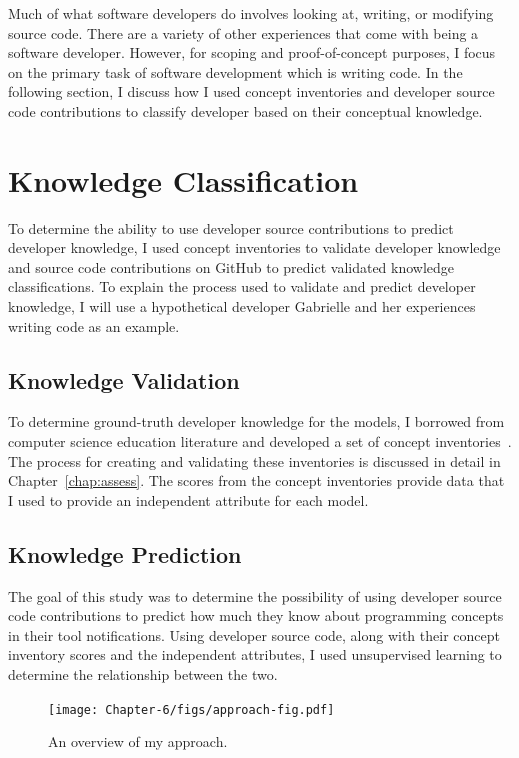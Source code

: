 Much of what software developers do involves looking at, writing, or modifying source code. 
There are a variety of other experiences that come with being a software developer. However, for scoping and proof-of-concept purposes, I focus on the primary task of software development which is writing code.
In the following section, I discuss how I used concept inventories and developer source code contributions to classify developer based on their conceptual knowledge.

\section{Knowledge Classification}

To determine the ability to use developer source contributions to predict developer knowledge, I used concept inventories to validate developer knowledge and source code contributions on GitHub to predict validated knowledge classifications.
To explain the process used to validate and predict developer knowledge, I will use a hypothetical developer Gabrielle and her experiences writing code as an example.

\subsection{Knowledge Validation}

To determine ground-truth developer knowledge for the models, I borrowed from computer science education literature and developed a set of concept inventories~\cite{tew2010assessing}.
The process for creating and validating these inventories is discussed in detail in Chapter~\ref{chap:assess}.
The scores from the concept inventories provide data that I used to provide an independent attribute for each model. 

\subsection{Knowledge Prediction}
The goal of this study was to determine the possibility of using developer source code contributions to predict how much they know about programming concepts in their tool notifications.
Using developer source code, along with their concept inventory scores and the independent attributes, I used unsupervised learning to determine the relationship between the two.

\begin{figure} [ht]
	\centering
	\texttt{[image: Chapter-6/figs/approach-fig.pdf]}
	\caption{An overview of my approach.}
	\label{fig:approach}
\end{figure}

